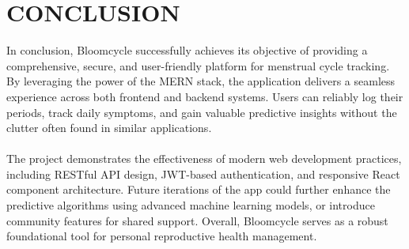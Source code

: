 \chapter{CONCLUSION}
In conclusion, Bloomcycle successfully achieves its objective of providing a comprehensive, secure, and user-friendly platform for menstrual cycle tracking. By leveraging the power of the MERN stack, the application delivers a seamless experience across both frontend and backend systems. Users can reliably log their periods, track daily symptoms, and gain valuable predictive insights without the clutter often found in similar applications.\\\\
The project demonstrates the effectiveness of modern web development practices, including RESTful API design, JWT-based authentication, and responsive React component architecture. Future iterations of the app could further enhance the predictive algorithms using advanced machine learning models, or introduce community features for shared support. Overall, Bloomcycle serves as a robust foundational tool for personal reproductive health management.
